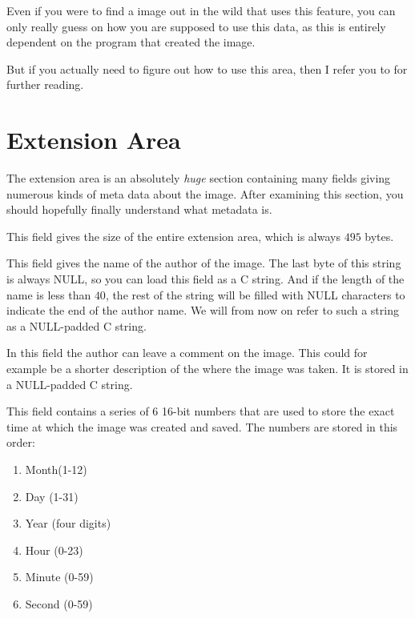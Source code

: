 Even if you were to find a \tga image out in the wild that uses this
feature, you can only really guess on how you are supposed to use this
data, as this is entirely dependent on the program that created the
image.

But if you actually need to figure out how to use this area, then I
refer you to
\cite{murray1996encyclopedia,91:_truev_tga_file_format_specif} for
further reading.

\section{Extension Area}
\label{sec:tga-extension-area}

The extension area is an absolutely \textit{huge} section containing
many fields giving numerous kinds of meta data about the image. After
examining this section, you should hopefully finally understand what
metadata is.


This field gives the size of the entire extension area, which is
always $495$ bytes.


This field gives the name of the author of the image. The last byte of
this string is always NULL, so you can load this field as a C
string. And if the length of the name is less than $40$, the rest of
the string will be filled with NULL characters to indicate the end of
the author name. We will from now on refer to such a string as a
NULL-padded C string.


In this field the author can leave a comment on the image. This could
for example be a shorter description of the where the image was
taken. It is stored in a NULL-padded C string.


This field contains a series of 6 16-bit numbers that are used to
store the exact time at which the image was created and saved. The
numbers are stored in this order:

\begin{enumerate}
\item Month(1-12)
\item Day (1-31)
\item Year (four digits)
\item Hour (0-23)
\item Minute (0-59)
\item Second (0-59)
\end{enumerate}

